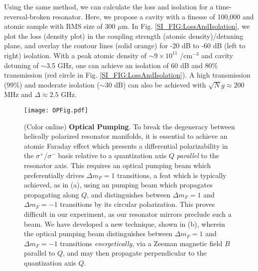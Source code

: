 \documentclass[aps,pra,twocolumn,groupedaddress,10pt,showpacs]{revtex4-1}
\begin{document}
Using the same method, we can calculate the loss and isolation for a time-reversal-broken resonator. Here, we propose a cavity with a finesse of 100,000 and atomic sample with RMS size of 300 $\mu$m. In Fig. \ref{SI_FIG:LossAndIsolation}, we plot the loss (density plot) in the coupling strength (atomic density)/detuning plane, and overlay the contour lines (solid orange) for -20 dB to -60 dB (left to right) isolation. With a peak atomic density of $\sim 9 \times 10^{11}$ /cm$^{-3}$ and cavity detuning of $\sim$3.5 GHz, one can achieve an isolation of 60 dB and 80\% transmission (red circle in Fig. \ref{SI_FIG:LossAndIsolation}). A high transmission (99\%) and moderate isolation ($\sim$30 dB) can also be achieved with $\sqrt{N}g \approx 200$ MHz and $\Delta \approx 2.5$ GHz. 

\begin{figure}
\texttt{[image: OPFig.pdf]}
\caption{(Color online) \textbf{Optical Pumping}. To break the degeneracy between helically polarized resonator manifolds, it is essential to achieve an atomic Faraday effect which presents a differential polarizability in the $\sigma^+$/$\sigma^-$ basis relative to a quantization axis $Q$ \emph{parallel} to the resonator axis. This requires an optical pumping beam which preferentially drives $\Delta m_F=1$ transitions, a feat which is typically achieved, as in (a), using an pumping beam which propagates propagating along $Q$, and distinguishes between $\Delta m_F=1$ and $\Delta m_F=-1$ transitions by its circular polarization. This proves difficult in our experiment, as our resonator mirrors preclude such a beam. We have developed a new technique, shown in (b), wherein the optical pumping beam distinguishes between $\Delta m_F=1$ and $\Delta m_F=-1$ transitions \emph{energetically}, via a Zeeman magnetic field $B$ parallel to $Q$, and may then propagate perpendicular to the quantization axis $Q$.}
\label{SI_FIG:OP}
\end{figure}
\end{document}
